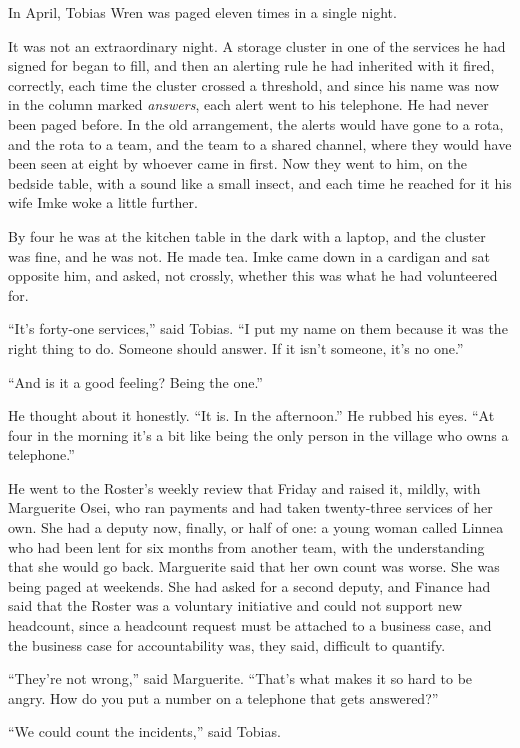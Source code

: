 \scenebreak
\noindent In April, Tobias Wren was paged eleven times in a single night.

It was not an extraordinary night. A storage cluster in one of the services he had signed for began to fill, and then an alerting rule he had inherited with it fired, correctly, each time the cluster crossed a threshold, and since his name was now in the column marked \emph{answers}, each alert went to his telephone. He had never been paged before. In the old arrangement, the alerts would have gone to a rota, and the rota to a team, and the team to a shared channel, where they would have been seen at eight by whoever came in first. Now they went to him, on the bedside table, with a sound like a small insect, and each time he reached for it his wife Imke woke a little further.

By four he was at the kitchen table in the dark with a laptop, and the cluster was fine, and he was not. He made tea. Imke came down in a cardigan and sat opposite him, and asked, not crossly, whether this was what he had volunteered for.

``It's forty-one services,'' said Tobias. ``I put my name on them because it was the right thing to do. Someone should answer. If it isn't someone, it's no one.''

``And is it a good feeling? Being the one.''

He thought about it honestly. ``It is. In the afternoon.'' He rubbed his eyes. ``At four in the morning it's a bit like being the only person in the village who owns a telephone.''

He went to the Roster's weekly review that Friday and raised it, mildly, with Marguerite Osei, who ran payments and had taken twenty-three services of her own. She had a deputy now, finally, or half of one: a young woman called Linnea who had been lent for six months from another team, with the understanding that she would go back. Marguerite said that her own count was worse. She was being paged at weekends. She had asked for a second deputy, and Finance had said that the Roster was a voluntary initiative and could not support new headcount, since a headcount request must be attached to a business case, and the business case for accountability was, they said, difficult to quantify.

``They're not wrong,'' said Marguerite. ``That's what makes it so hard to be angry. How do you put a number on a telephone that gets answered?''

``We could count the incidents,'' said Tobias.

